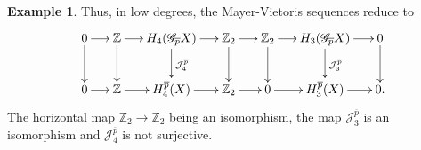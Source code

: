 \documentclass[a4paper,10pt,english,reqno]{amsart}
\theoremstyle{plain}
\theoremstyle{definition}
\newtheorem{example}[proposition]{Example}
\theoremstyle{remark}
\numberwithin{equation}{section}
\def\ov{\overline}
\def\cJ{{\mathcal J}}
\def\crG{{\mathscr G}}
\def\Z{\mathbb{Z}}
\renewcommand\1{\hbox{\ding{192}}}
\renewcommand\2{\hbox{\ding{193}}}
\newcommand\3{\hbox{\ding{194}}}
\newcommand\4{\hbox{\ding{195}}}
\begin{document}
\begin{example}
 \smallskip
Thus, in low degrees, the Mayer-Vietoris sequences reduce to
$$
\scalebox{1}{
\xymatrix@C=.5cm{
  0
   \ar[r]\ar[d]&
   \Z
    \ar[r]\ar[d] &
   H_4(\crG_{\ov p}X)   \ar[r]\ar[d]^{ \cJ^{\ov{p}}_{4}}&
\Z_2
   \ar[r]\ar[d]&
\Z_2
   \ar[r]\ar[d]&
   H_3(\crG_{\ov p} X)  \ar[d]^{ \cJ^{\ov{p}}_{3}} \ar[r] &
  \ar[d] 0
 \\
0
   \ar[r]&
\Z
    \ar[r] &
   H_4^{\ov p}(X)  \ar[r] &
\Z_2
   \ar[r]&
0
   \ar[r]&
   H_3^{\ov p}(X)  \ar[r] &
0.
 }}
$$
The horizontal map $\Z_{2}\to \Z_{2}$ being an isomorphism, the map $\cJ_{3}^{\ov{p}}$ is an isomorphism and 
$\cJ_{4}^{\ov{p}}$ is not surjective.
%
\end{example}

\providecommand{\bysame}{\leavevmode\hbox to3em{\hrulefill}\thinspace}
\providecommand{\MR}{\relax\ifhmode\unskip\space\fi MR }
\providecommand{\MRhref}[2]{%
  \href{http://www.ams.org/mathscinet-getitem?mr=#1}{#2}
}
\providecommand{\href}[2]{#2}
\end{document}
